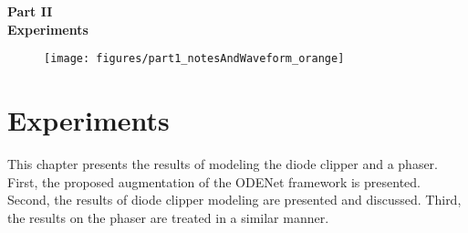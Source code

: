 \cleardoublepage
\thispagestyle{empty}
\begin{center}
\vspace*{3cm}
{\huge \bf Part II}\\ \vspace*{1cm}
{\Huge \bf Experiments}\\\vspace*{0.2cm}
\begin{figure}[ht]
\centering
\texttt{[image: figures/part1\_notesAndWaveform\_orange]}
\end{figure}
\end{center}
\label{par:part2}
\newpage
\quad
\thispagestyle{empty}
\newpage
\chapter{Experiments}
\label{chapter:experiments}

This chapter presents the results of modeling the diode clipper and a phaser. First, the proposed augmentation of the ODENet framework is presented. Second, the results of diode clipper modeling are presented and discussed. Third, the results on the phaser are treated in a similar manner.




